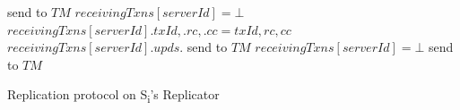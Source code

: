\documentclass{vldb}
\begin{document}
\begin{algorithm}
\begin{algorithmic}[1]
				\State send  to $\mathit{TM}$ 
				\State $\mathit{receivingTxns[serverId] = \bot}$
			\EndIf
			\State $\mathit{receivingTxns[serverId].txId, .rc, .cc = txId, rc, cc}$
			\State $\mathit{receivingTxns[serverId].upds}$.
		\EndFunction
				\State send  to $\mathit{TM}$
				\State $\mathit{receivingTxns[serverId] = \bot}$
			\EndIf
			\State send  to $\mathit{TM}$
		\EndFunction
	\end{algorithmic}
	\caption{Replication protocol on S\textsubscript{i}'s Replicator}
	\label{alg:replication_repl}
\end{algorithm}
\end{document}
